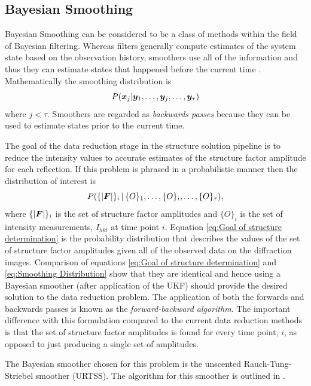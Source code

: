\subsection{Bayesian Smoothing}
\label{sub:Bayesian Smoothing}
Bayesian Smoothing can be considered to be a class of methods within the field of Bayesian filtering.
Whereas filters generally compute estimates of the system state based on the observation history, smoothers use all of the information and thus they can estimate states that happened before the current time \cite{sarkka2013}.
Mathematically the smoothing distribution is
\begin{equation}
    P(\boldsymbol{x}_j | \boldsymbol{y}_1, \ldots, \boldsymbol{y}_j, \ldots, \boldsymbol{y}_{\tau})
    \label{eq:Smoothing Distribution}
\end{equation}
where $j < \tau$.
Smoothers are regarded as \textit{backwards passes} because they can be used to estimate states prior to the current time.

The goal of the data reduction stage in the structure solution pipeline is to reduce the intensity values to accurate estimates of the structure factor amplitude for each reflection.
If this problem is phrased in a probabilistic manner then the distribution of interest is
\begin{equation}
    P(\{|\boldsymbol{F}|\}_i \,|\, \{O\}_1, \ldots, \{O\}_i,\ldots, \{O\}_{\tau}),
    \label{eq:Goal of structure determination}
\end{equation}
where $\{|\boldsymbol{F}|\}_i$ is the set of structure factor amplitudes and $\{O\}_i$ is the set of intensity measurements, $I_{hkl}$ at time point $i$.
Equation \ref{eq:Goal of structure determination} is the probability distribution that describes the values of the set of structure factor amplitudes given all of the observed data on the diffraction images.
Comparison of equations \ref{eq:Goal of structure determination} and \ref{eq:Smoothing Distribution} show that they are identical and hence using a Bayesian smoother (after application of the UKF) should provide the desired solution to the data reduction problem.
The application of both the forwards and backwards passes is known as the \textit{forward-backward algorithm}.
The important difference with this formulation compared to the current data reduction methods is that the set of structure factor amplitudes is found for every time point, $i$, as opposed to just producing a single set of amplitudes.

The Bayesian smoother chosen for this problem is the unscented Rauch-Tung-Striebel smoother (URTSS).
The algorithm for this smoother is outlined in \cite{sarkka2008unscented}.

